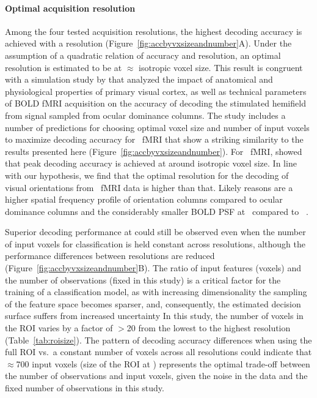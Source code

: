 \paragraph*{Optimal acquisition resolution}
%
Among the four tested acquisition resolutions, the highest decoding accuracy is
achieved with a  resolution (Figure~\ref{fig:accbyvxsizeandnumber}A).
Under the assumption of a quadratic relation of accuracy and resolution, an
optimal resolution is estimated to be at $\approx$ isotropic
voxel size. This result is congruent with a simulation study by
\citet{chaimow_2011} that analyzed the impact of anatomical and physiological
properties of primary visual cortex, as well as technical parameters of BOLD
fMRI acquisition on the accuracy of decoding the stimulated hemifield from
signal sampled from ocular dominance columns. The study includes a number of
predictions for choosing optimal voxel size and number of input voxels to
maximize decoding accuracy for \threeT\ fMRI \citep[see Figure 6
in][]{chaimow_2011} that show a striking similarity to the results presented
here (Figure~\ref{fig:accbyvxsizeandnumber}). For \threeT\ fMRI,
\citet{chaimow_2011} showed that peak decoding accuracy is achieved at around
 isotropic voxel size. In line with our hypothesis, we find that the
optimal resolution for the decoding of visual orientations from \sevenT\ fMRI
data is higher than that. Likely reasons are a higher spatial frequency
profile of orientation columns compared to ocular dominance columns
\citep[see][for evidence from monkeys]{obermayer_1993} and the considerably
smaller BOLD PSF at \sevenT\ compared to \threeT\ \citep[ FWHM
vs.  FWHM][]{shmuel_2007, engel_1997}.

Superior decoding performance at  could still be observed even when the
number of input voxels for classification is held constant across resolutions,
although the performance differences between resolutions are reduced
(Figure~\ref{fig:accbyvxsizeandnumber}B). The ratio of input features (voxels)
and the number of observations (fixed in this study) is a critical factor for
the training of a classification model, as with increasing dimensionality the
sampling of the feature space becomes sparser, and, consequently, the estimated
decision surface suffers from increased uncertainty \cite[curse of
dimensionality, ][after \citealt{friedman2001elements}]{bellman1961adaptive} In
this study, the number of voxels in the ROI varies by a factor of $>$20 from
the lowest to the highest resolution (Table~\ref{tab:roisize}). The pattern of
decoding accuracy differences when using the full ROI vs.~a constant number of
voxels across all resolutions could indicate that $\approx$700 input voxels
(size of the ROI at ) represents the optimal trade-off between the number
of observations and input voxels, given the noise in the data and the fixed
number of observations in this study.

